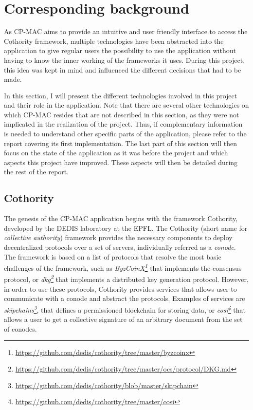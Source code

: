 \section{Corresponding background}
As CP-MAC aims to provide an intuitive and user friendly interface to access the Cothority framework, multiple technologies have been abstracted into the application to give regular users the possibility to use the application without having to know the inner working of the frameworks it uses. During this project, this idea was kept in mind and influenced the different decisions that had to be made. 

In this section, I will present the different technologies involved in this project and their role in the application. Note that there are several other technologies on which CP-MAC resides that are not described in this section, as they were not implicated in the realization of the project. Thus, if complementary information is needed to understand other specific parts of the application, please refer to the report covering its first implementation\cite{petrimaire2018}. The last part of this section will then focus on the state of the application as it was before the project and which aspects this project have improved. These aspects will then be detailed during the rest of the report.


\subsection{Cothority}
The genesis of the CP-MAC application begins with the framework Cothority, developed by the DEDIS laboratory at the EPFL. The Cothority (short name for \textit{collective authority}) framework provides the necessary components to deploy decentralized protocols over a set of servers, individually referred as a \textit{conode}.  The framework is based on a list of protocols that resolve the most basic challenges of the framework, such as \textit{ByzCoinX\footnote{\url{https://github.com/dedis/cothority/tree/master/byzcoinx}}} that implements the consensus protocol, or \textit{dkg\footnote{\url{https://github.com/dedis/cothority/tree/master/ocs/protocol/DKG.md}}} that implements a distributed key generation protocol. However, in order to use these protocols, Cothority provides services that allows user to communicate with a conode and abstract the protocols. Examples of services are \textit{skipchains\footnote{\url{https://github.com/dedis/cothority/blob/master/skipchain}}}, that defines a permissioned blockchain for storing data, or \textit{cosi\footnote{\url{https://github.com/dedis/cothority/tree/master/cosi}}} that allows a user to get a collective signature of an arbitrary document from the set of conodes.

